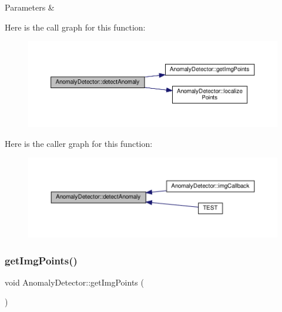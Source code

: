 \begin{DoxyParams}{Parameters}
{\em } & \\
\hline
\end{DoxyParams}
Here is the call graph for this function\+:\nopagebreak
\begin{figure}[H]
\begin{center}
\leavevmode
\includegraphics[width=350pt]{class_anomaly_detector_ac053d1b920d7cd4608bc3de291a7aeb0_cgraph}
\end{center}
\end{figure}
Here is the caller graph for this function\+:\nopagebreak
\begin{figure}[H]
\begin{center}
\leavevmode
\includegraphics[width=350pt]{class_anomaly_detector_ac053d1b920d7cd4608bc3de291a7aeb0_icgraph}
\end{center}
\end{figure}
\mbox{\label{class_anomaly_detector_aaaa09563dc7e8f76609b9e9b9e901dce}} 
\subsubsection{\texorpdfstring{get\+Img\+Points()}{getImgPoints()}}
{\footnotesize\ttfamily void Anomaly\+Detector\+::get\+Img\+Points (\begin{DoxyParamCaption}{ }\end{DoxyParamCaption})}



